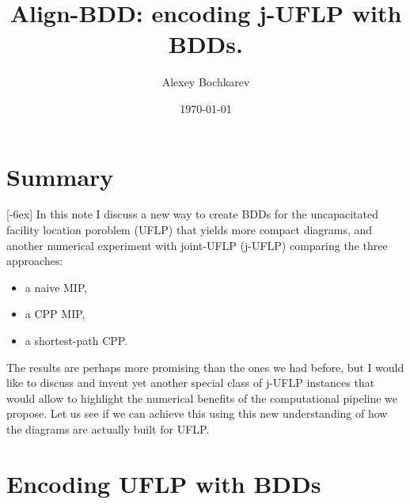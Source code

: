 \documentclass[11pt]{article}
\author{Alexey Bochkarev}
\date{\today}
\title{Align-BDD: encoding j-UFLP with BDDs.}
\begin{document}
\maketitle

\section{Summary}
\label{sec:orgc3a554e}
[-6ex]
In this note I discuss a new way to create BDDs for the uncapacitated facility
location poroblem (UFLP) that yields more compact diagrams, and another
numerical experiment with joint-UFLP (j-UFLP) comparing the three approaches:
\begin{itemize}
\item a naive MIP,
\item a CPP MIP,
\item a shortest-path CPP.
\end{itemize}

The results are perhaps more promising than the ones we had before, but I would
  like to discuss and invent yet another special class of j-UFLP instances that
  would allow to highlight the numerical benefits of the computational pipeline
  we propose. Let us see if we can achieve this using this new understanding of
  how the diagrams are actually built for UFLP.

\section{Encoding UFLP with BDDs}
\label{sec:org0eb0cfa}
\end{document}
